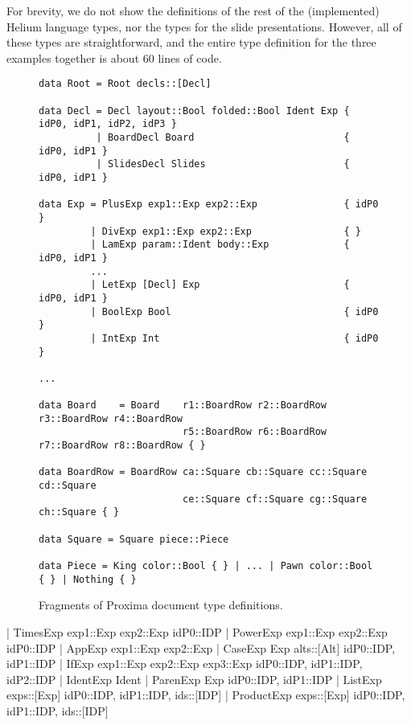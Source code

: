 For brevity, we do not show the definitions of the rest of the (implemented) Helium language types, nor the types for the slide presentations. However, all of these types are straightforward, and the entire type definition for the three examples together is about 60 lines of code.


\begin{figure}[t]
\begin{small}
\begin{center}
\begin{footnotesize}
\begin{verbatim}
data Root = Root decls::[Decl]

data Decl = Decl layout::Bool folded::Bool Ident Exp { idP0, idP1, idP2, idP3 }
          | BoardDecl Board                          { idP0, idP1 }
          | SlidesDecl Slides                        { idP0, idP1 }

data Exp = PlusExp exp1::Exp exp2::Exp               { idP0 }
         | DivExp exp1::Exp exp2::Exp                { }
         | LamExp param::Ident body::Exp             { idP0, idP1 }
         ...
         | LetExp [Decl] Exp                         { idP0, idP1 }
         | BoolExp Bool                              { idP0 }
         | IntExp Int                                { idP0 }

...

data Board    = Board    r1::BoardRow r2::BoardRow r3::BoardRow r4::BoardRow
                         r5::BoardRow r6::BoardRow r7::BoardRow r8::BoardRow { }

data BoardRow = BoardRow ca::Square cb::Square cc::Square cd::Square
                         ce::Square cf::Square cg::Square ch::Square { }

data Square = Square piece::Piece

data Piece = King color::Bool { } | ... | Pawn color::Bool { } | Nothing { }
\end{verbatim}
\end{footnotesize}
\caption{Fragments of Proxima document type definitions.}\label{docTypeExample} 
\end{center}
\end{small}
\end{figure}

\bc
         | TimesExp  exp1::Exp exp2::Exp                     { idP0::IDP }
         | PowerExp exp1::Exp exp2::Exp                      { idP0::IDP }
         | AppExp exp1::Exp exp2::Exp                        { }
         | CaseExp Exp alts::[Alt]                          { idP0::IDP, idP1::IDP }
         | IfExp exp1::Exp exp2::Exp exp3::Exp                { idP0::IDP, idP1::IDP, idP2::IDP }
         | IdentExp Ident                                  { }
         | ParenExp Exp                                    { idP0::IDP, idP1::IDP }
         | ListExp exps::[Exp]                              { idP0::IDP, idP1::IDP, ids::[IDP] }
         | ProductExp exps::[Exp]                           { idP0::IDP, idP1::IDP, ids::[IDP] }

